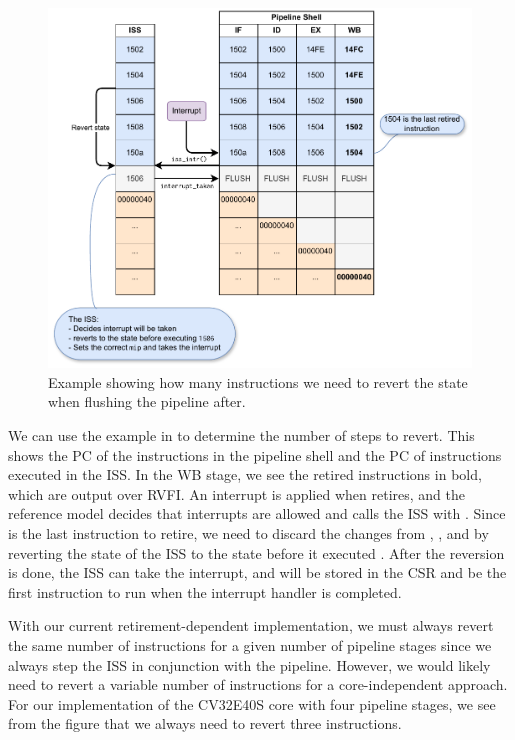 \begin{figure}
    \centering
    \includegraphics[width=0.85\linewidth]{figures/revert_example.pdf}
    \caption{Example showing how many instructions we need to revert the state when flushing the pipeline after.}
    \label{fig:revert_example}
\end{figure}


We can use the example in  to determine the number of steps to revert.
This shows the PC of the instructions in the pipeline shell and the PC of instructions executed in the ISS. In the WB stage, we see the retired instructions in bold, which are output over RVFI. An interrupt is applied when  retires, and the reference model decides that interrupts are allowed and calls the ISS with . Since  is the last instruction to retire, we need to discard the changes from , , and  by reverting the state of the ISS to the state before it executed . After the reversion is done, the ISS can take the interrupt, and  will be stored in the  CSR and be the first instruction to run when the interrupt handler is completed.

With our current retirement-dependent implementation, we must always revert the same number of instructions for a given number of pipeline stages since we always step the ISS in conjunction with the pipeline. However, we would likely need to revert a variable number of instructions for a core-independent approach. For our implementation of the CV32E40S core with four pipeline stages, we see from the figure that we always need to revert three instructions.



